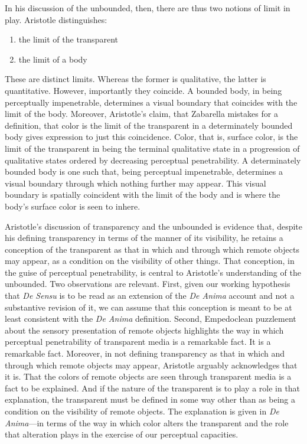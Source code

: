 In his discussion of the unbounded, then, there are thus two notions of limit in play. Aristotle distinguishes:
\begin{enumerate}[(1)]
	\item the limit of the transparent
	\item the limit of a body
\end{enumerate}
These are distinct limits. Whereas the former is qualitative, the latter is quantitative. However, importantly they coincide. A bounded body, in being perceptually impenetrable, determines a visual boundary that coincides with the limit of the body. Moreover, Aristotle's claim, that Zabarella mistakes for a definition, that color is the limit of the transparent in a determinately bounded body gives expression to just this coincidence. Color, that is, surface color, is the limit of the transparent in being the terminal qualitative state in a progression of qualitative states ordered by decreasing perceptual penetrability. A determinately bounded body is one such that, being perceptual impenetrable, determines a visual boundary through which nothing further may appear. This visual boundary is spatially coincident with the limit of the body and is where the body's surface color is seen to inhere.

Aristotle's discussion of transparency and the unbounded is evidence that, despite his defining transparency in terms of the manner of its visibility, he retains a conception of the transparent as that in which and through which remote objects may appear, as a condition on the visibility of other things. That conception, in the guise of perceptual penetrability, is central to Aristotle's understanding of the unbounded. Two observations are relevant. First, given our working hypothesis that \emph{De Sensu} is to be read as an extension of the \emph{De Anima} account and not a substantive revision of it, we can assume that this conception is meant to be at least consistent with the \emph{De Anima} definition.  Second, Empedoclean puzzlement about the sensory presentation of remote objects highlights the way in which perceptual penetrability of transparent media is a remarkable fact. It is a remarkable fact. Moreover, in not defining transparency as that in which and through which remote objects may appear, Aristotle arguably acknowledges that it is. That the colors of remote objects are seen through transparent media is a fact to be explained. And if the nature of the transparent is to play a role in that explanation, the transparent must be defined in some way other than as being a condition on the visibility of remote objects. The explanation is given in \emph{De Anima}---in terms of the way in which color alters the transparent and the role that alteration plays in the exercise of our perceptual capacities. 


